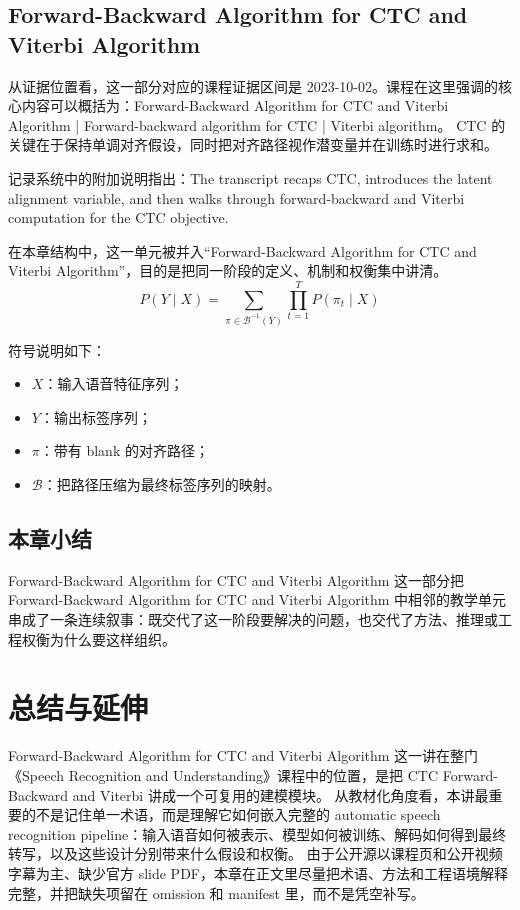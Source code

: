 \documentclass[a4paper]{article}
\begin{document}
\subsection{Forward-Backward Algorithm for CTC and Viterbi Algorithm}
从证据位置看，这一部分对应的课程证据区间是 2023-10-02。课程在这里强调的核心内容可以概括为：Forward-Backward Algorithm for CTC and Viterbi Algorithm | Forward-backward algorithm for CTC | Viterbi algorithm。
CTC 的关键在于保持单调对齐假设，同时把对齐路径视作潜变量并在训练时进行求和。

记录系统中的附加说明指出：The transcript recaps CTC, introduces the latent alignment variable, and then walks through forward-backward and Viterbi computation for the CTC objective.

在本章结构中，这一单元被并入“Forward-Backward Algorithm for CTC and Viterbi Algorithm”，目的是把同一阶段的定义、机制和权衡集中讲清。
\[
P(Y \mid X) = \sum_{\pi \in \mathcal{B}^{-1}(Y)} \prod_{t=1}^{T} P(\pi_t \mid X)
\]

符号说明如下：
\begin{itemize}
\item $X$：输入语音特征序列；
\item $Y$：输出标签序列；
\item $\pi$：带有 blank 的对齐路径；
\item $\mathcal{B}$：把路径压缩为最终标签序列的映射。
\end{itemize}

\subsection{本章小结}
Forward-Backward Algorithm for CTC and Viterbi Algorithm 这一部分把 Forward-Backward Algorithm for CTC and Viterbi Algorithm 中相邻的教学单元串成了一条连续叙事：既交代了这一阶段要解决的问题，也交代了方法、推理或工程权衡为什么要这样组织。

\section{总结与延伸}
Forward-Backward Algorithm for CTC and Viterbi Algorithm 这一讲在整门《Speech Recognition and Understanding》课程中的位置，是把 CTC Forward-Backward and Viterbi 讲成一个可复用的建模模块。
从教材化角度看，本讲最重要的不是记住单一术语，而是理解它如何嵌入完整的 automatic speech recognition pipeline：输入语音如何被表示、模型如何被训练、解码如何得到最终转写，以及这些设计分别带来什么假设和权衡。
由于公开源以课程页和公开视频字幕为主、缺少官方 slide PDF，本章在正文里尽量把术语、方法和工程语境解释完整，并把缺失项留在 omission 和 manifest 里，而不是凭空补写。
\end{document}
